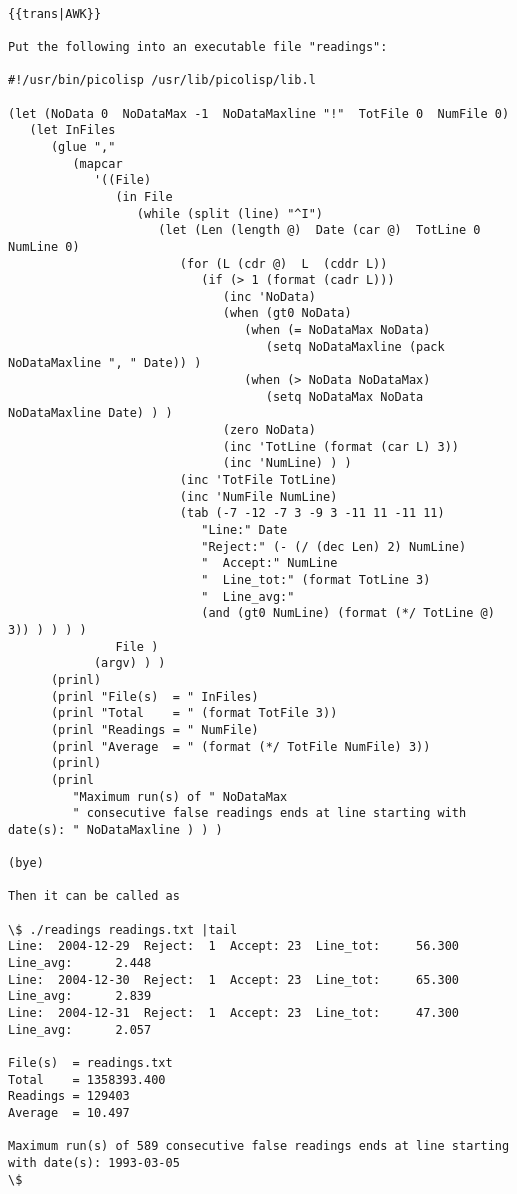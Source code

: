 \begin{verbatim}

{{trans|AWK}}

Put the following into an executable file "readings":

#!/usr/bin/picolisp /usr/lib/picolisp/lib.l

(let (NoData 0  NoDataMax -1  NoDataMaxline "!"  TotFile 0  NumFile 0)
   (let InFiles
      (glue ","
         (mapcar
            '((File)
               (in File
                  (while (split (line) "^I")
                     (let (Len (length @)  Date (car @)  TotLine 0  NumLine 0)
                        (for (L (cdr @)  L  (cddr L))
                           (if (> 1 (format (cadr L)))
                              (inc 'NoData)
                              (when (gt0 NoData)
                                 (when (= NoDataMax NoData)
                                    (setq NoDataMaxline (pack NoDataMaxline ", " Date)) )
                                 (when (> NoData NoDataMax)
                                    (setq NoDataMax NoData  NoDataMaxline Date) ) )
                              (zero NoData)
                              (inc 'TotLine (format (car L) 3))
                              (inc 'NumLine) ) )
                        (inc 'TotFile TotLine)
                        (inc 'NumFile NumLine)
                        (tab (-7 -12 -7 3 -9 3 -11 11 -11 11)
                           "Line:" Date
                           "Reject:" (- (/ (dec Len) 2) NumLine)
                           "  Accept:" NumLine
                           "  Line_tot:" (format TotLine 3)
                           "  Line_avg:"
                           (and (gt0 NumLine) (format (*/ TotLine @) 3)) ) ) ) )
               File )
            (argv) ) )
      (prinl)
      (prinl "File(s)  = " InFiles)
      (prinl "Total    = " (format TotFile 3))
      (prinl "Readings = " NumFile)
      (prinl "Average  = " (format (*/ TotFile NumFile) 3))
      (prinl)
      (prinl
         "Maximum run(s) of " NoDataMax
         " consecutive false readings ends at line starting with date(s): " NoDataMaxline ) ) )

(bye)

Then it can be called as

\$ ./readings readings.txt |tail
Line:  2004-12-29  Reject:  1  Accept: 23  Line_tot:     56.300  Line_avg:      2.448
Line:  2004-12-30  Reject:  1  Accept: 23  Line_tot:     65.300  Line_avg:      2.839
Line:  2004-12-31  Reject:  1  Accept: 23  Line_tot:     47.300  Line_avg:      2.057

File(s)  = readings.txt
Total    = 1358393.400
Readings = 129403
Average  = 10.497

Maximum run(s) of 589 consecutive false readings ends at line starting with date(s): 1993-03-05
\$

\end{verbatim}

